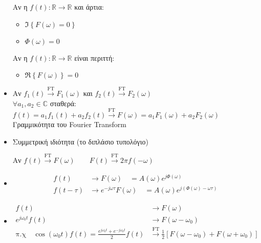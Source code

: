 \documentclass[11pt,a4paper,titlepage,fleqn]{article}
\begin{document}
\begin{itemize}
	 Αν η \( f(t):\mathbb R \to \mathbb R  \) και άρτια:
	 \begin{itemize}
	 	\item \( \Im\left\lbrace F(\omega)=0 \right\rbrace \)
	 	\item \( \Phi(\omega) = 0 \)
	 \end{itemize}
	 
	 Αν η \( f(t):\mathbb R\to\mathbb R  \) είναι περιττή:
	 \begin{itemize}
	 	\item \( \Re\left\lbrace F(\omega) \right\rbrace = 0 \)
	 \end{itemize}
	 
	 \item
	 
	 Αν \( f_1(t) \xrightarrow{\text{FT}} F_1(\omega ) \) και
	 \( f_2(t)\xrightarrow{\text{FT}} F_2(\omega ) \) \\
	 \( \forall a_1,a_2\in\mathbb C \) σταθερά: \\
	 \( f(t) = a_1f_1(t)+a_2f_2(t) \xrightarrow{\text{FT}}
	 F(\omega) = a_1F_1(\omega)+a_2F_2(\omega)
	  \) \\
	  Γραμμικότητα του Fourier Transform
	  
	 \item Συμμετρική ιδιότητα (το διπλάσιο τυπολόγιο)
	 
	 Αν \( f(t)\xrightarrow{\text{FT}} F(\omega)
	 \qquad F(t)\xrightarrow{\text{FT}} 2\pi f(-\omega)
	  \)
	  
	 \item 
	 \begin{align*}
	 f(t) &\to F(\omega ) \quad = A(\omega) e^{j\Phi(\omega )} \\
	 f(t-\tau) &\to e^{-j\omega \tau}F(\omega ) \quad =
	 A(\omega )e^{j\left( \Phi(\omega )-\omega \tau \right)}
	 \end{align*}
	 
	 \item
	 \begin{align*}
	 f(t)&\to F(\omega) \\
	 e^{j\omega_0 t}f(t) &\to F(\omega-\omega_0) \\[7pt]
	 \text{π.χ}\quad \cos(\omega_0 t)f(t)=
	 \frac{e^{j\omega_0 t}+e^{-j\omega_0 t}}{2}f(t) &\xrightarrow{\text{FT}}
	 \frac{1}{2}\left[
	 F(\omega-\omega_0)+F(\omega+\omega_0)
	 \right]
	 \end{align*}
	 
	 \end{itemize}
	 
\end{document}
